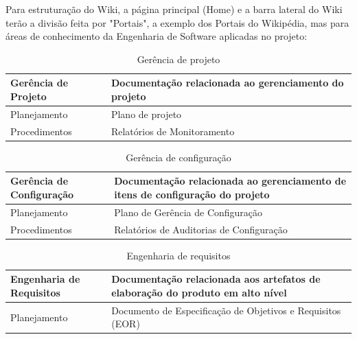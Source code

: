 Para estruturação do Wiki, a página principal (Home) e a barra lateral do Wiki terão a divisão feita por "Portais", a exemplo dos Portais do Wikipédia, mas para áreas de conhecimento da Engenharia de Software aplicadas no projeto:


\begin{table}[H]
      \begin{center}
        \begin{tabular}{| l | p{6cm} |}
        \hline
        \textbf{Gerência de Projeto} & \textbf{Documentação relacionada ao gerenciamento do projeto} \\ \hline
        Planejamento & Plano de projeto \\ \hline
        Procedimentos & Relatórios de Monitoramento \\ \hline
        \end{tabular}
      \end{center}
    \caption{Gerência de projeto}
    \end{table}

  

\begin{table}[H]
      \begin{center}
        \begin{tabular}{| l | p{6cm} |}
        \hline
        \textbf{Gerência de Configuração} & \textbf{Documentação relacionada ao gerenciamento de itens de configuração do projeto} \\ \hline
        Planejamento & Plano de Gerência de Configuração \\ \hline
        Procedimentos & Relatórios de Auditorias de Configuração \\ \hline
        \end{tabular}
      \end{center}
    \caption{Gerência de configuração}
    \end{table}

\begin{table}[H]
      \begin{center}
        \begin{tabular}{| l | p{6cm} |}
        \hline
        \textbf{Engenharia de Requisitos} & \textbf{Documentação relacionada aos artefatos de elaboração do produto em alto nível} \\ \hline
        Planejamento & Documento de Especificação de Objetivos e Requisitos (EOR) \\ \hline
        \end{tabular}
      \end{center}
    \caption{Engenharia de requisitos}
    \end{table}

